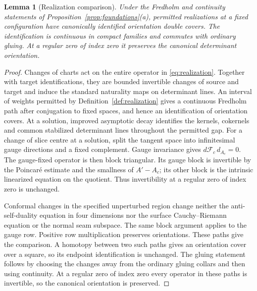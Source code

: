 \documentclass[11pt]{amsart}
\newtheorem{lemma}[theorem]{Lemma}
\theoremstyle{definition}
\theoremstyle{remark}
\theoremstyle{plain}
\numberwithin{equation}{section}
\begin{document}
\begin{lemma}[Realization comparison]\label{lem:realization}
Under the Fredholm and continuity statements of
Proposition~\ref{prop:foundations}(a), permitted realizations
at a fixed configuration have canonically identified
orientation double covers. The identification is continuous
in compact families and commutes with ordinary gluing. At a
regular zero of index zero it preserves the canonical determinant
orientation.
\end{lemma}
\begin{proof}
Changes of charts act on the entire operator in
\eqref{eq:realization}. Together with target identifications,
they are bounded invertible changes of source and target and induce
the standard naturality maps on determinant lines. An interval of
weights permitted by Definition~\ref{def:realization} gives a continuous Fredholm path after conjugation
to fixed spaces, and hence an identification of orientation covers.
At a solution, improved asymptotic decay identifies the kernels,
cokernels and common stabilized determinant lines throughout the
permitted gap. For a change of slice centre at a solution, split the
tangent space into infinitesimal gauge directions and a
fixed complement. Gauge invariance gives
$d\mathcal F_c\,d_{A_c}=0$. The gauge-fixed operator is then
block triangular. Its gauge block is invertible by the
Poincar\'e estimate and the smallness of $A'-A_c$; its other
block is the intrinsic linearized equation on the quotient.
Thus invertibility at a regular zero of index zero is unchanged.

Conformal changes in the specified unperturbed region change
neither the anti-self-duality equation in four dimensions nor
the surface Cauchy--Riemann equation or the normal seam subspace.
The same block argument applies to the gauge row. Positive row
multiplication preserves orientations. These paths give the
comparison. A homotopy between two such paths gives an orientation
cover over a square, so its endpoint identification is unchanged.
The gluing statement follows by choosing the changes away
from the ordinary gluing collars and then using continuity.
At a regular zero of index zero every operator in these paths is
invertible, so the canonical orientation is preserved.
\end{proof}
\end{document}
